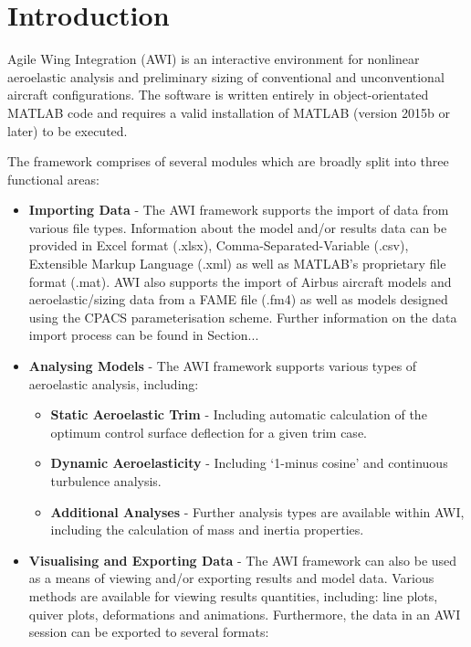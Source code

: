 \newpage
{}
\section*{Introduction}

Agile Wing Integration (AWI) is an interactive environment for nonlinear aeroelastic analysis and preliminary sizing of conventional and unconventional aircraft configurations. The software is written entirely in object-orientated MATLAB code and requires a valid installation of MATLAB (version 2015b or later) to be executed. 

\parindent=0pt The framework comprises of several modules which are broadly split into three functional areas:


\begin{itemize}

\item \textbf{Importing Data} - The AWI framework supports the import of data from various file types. Information about the model and/or results data can be provided in Excel format (.xlsx), Comma-Separated-Variable (.csv), Extensible Markup Language (.xml) as well as MATLAB’s proprietary file format (.mat). AWI also supports the import of Airbus aircraft models and aeroelastic/sizing data from a FAME file (.fm4) as well as models designed using the CPACS parameterisation scheme. Further information on the data import process can be found in Section...

\item \textbf{Analysing Models} - The AWI framework supports various types of aeroelastic analysis, including:

\begin{itemize}

\item \textbf{Static Aeroelastic Trim} - Including automatic calculation of the optimum control surface deflection for a given trim case. 

\item \textbf{Dynamic Aeroelasticity} - Including ‘1-minus cosine’ and continuous turbulence analysis. 


\item \textbf{Additional Analyses} - Further analysis types are available within AWI, including the calculation of mass and inertia properties.

\end{itemize}

\item \textbf{Visualising and Exporting Data} - The AWI framework can also be used as a means of viewing and/or exporting results and model data.  Various methods are available for viewing results quantities, including: line plots, quiver plots, deformations and animations. Furthermore, the data in an AWI session can be exported to several formats:

\end{itemize}

